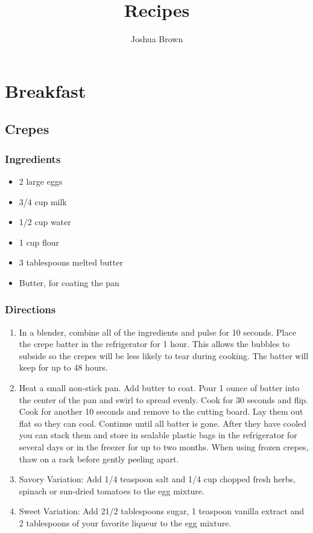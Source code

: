 \documentclass[oneside,11pt]{book}
\title{\bf \Huge Recipes}
\author{Joshua Brown}
\date{}
\newcommand{\Ingredients}[1]{
    \subsection*{Ingredients}
    \begin{itemize} 
        #1 
    \end{itemize}
}
\newcommand{\Directions}[1]{
    \subsection*{Directions}
    \begin{enumerate} 
        #1 
    \end{enumerate}
}
\newcommand{\recipe}[3]{
    \pagebreak
    \section*{ \hspace{-12pt} #1 }
    \addcontentsline{toc}{section}{ \hspace{-6pt} #1 }
    
    \begin{minipage}[t]{0.35\textwidth}
        #2
    \end{minipage}
    \hspace{0.05\textwidth}
    \begin{minipage}[t]{0.6\textwidth}
        #3
    \end{minipage}
}
\begin{document}
\maketitle
\tableofcontents{}

\chapter{Breakfast}
    \recipe{Crepes}{
        \Ingredients{
            \item 2 large eggs
            \item 3/4 cup milk
            \item 1/2 cup water
            \item 1 cup flour
            \item 3 tablespoons melted butter
            \item Butter, for coating the pan
        }
    }{
        \Directions{
            \item In a blender, combine all of the ingredients and pulse for 10 seconds. 
                Place the crepe batter in the refrigerator for 1 hour. 
                This allows the bubbles to subside so the crepes will be less likely to tear during cooking. 
                The batter will keep for up to 48 hours.
            \item Heat a small non-stick pan. 
                Add butter to coat. 
                Pour 1 ounce of batter into the center of the pan and swirl to spread evenly. 
                Cook for 30 seconds and flip. Cook for another 10 seconds and remove to the cutting board. 
                Lay them out flat so they can cool. 
                Continue until all batter is gone. 
                After they have cooled you can stack them and store in sealable plastic bags in the refrigerator for several days or in the freezer for up to two months. 
                When using frozen crepes, thaw on a rack before gently peeling apart.
            \item Savory Variation: Add 1/4 teaspoon salt and 1/4 cup chopped fresh herbs, spinach or sun-dried tomatoes to the egg mixture.
            \item Sweet Variation: Add 21/2 tablespoons sugar, 1 teaspoon vanilla extract and 2 tablespoons of your favorite liqueur to the egg mixture.
        }
    }
    
\end{document}
